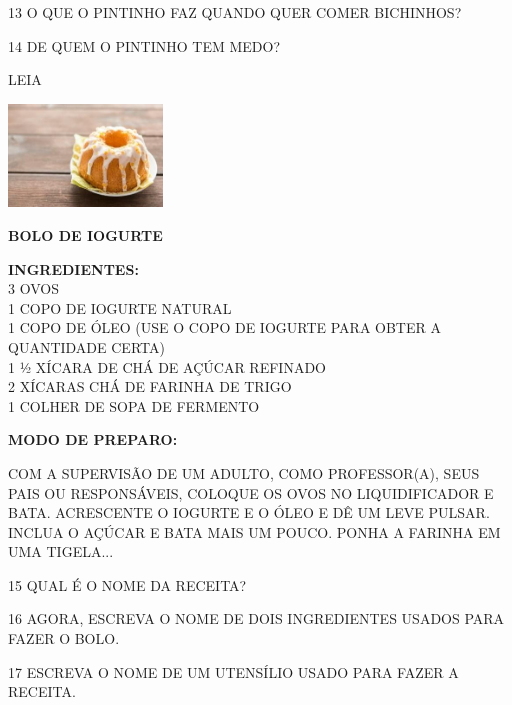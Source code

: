 \num{13} O QUE O PINTINHO FAZ QUANDO QUER COMER BICHINHOS?


\num{14} DE QUEM O PINTINHO TEM MEDO?


LEIA

\includegraphics[width=1.61944in,height=1.07917in]{media/image130.jpg}

\textbf{BOLO DE IOGURTE}

\textbf{INGREDIENTES:}\\
3 OVOS\\
1 COPO DE IOGURTE NATURAL\\
1 COPO DE ÓLEO (USE O COPO DE IOGURTE PARA OBTER A QUANTIDADE CERTA)\\
1 ½ XÍCARA DE CHÁ DE AÇÚCAR REFINADO\\
2 XÍCARAS CHÁ DE FARINHA DE TRIGO\\
1 COLHER DE SOPA DE FERMENTO

\textbf{MODO DE PREPARO:}

COM A SUPERVISÃO DE UM ADULTO, COMO PROFESSOR(A), SEUS PAIS OU RESPONSÁVEIS, COLOQUE OS OVOS NO LIQUIDIFICADOR E BATA. ACRESCENTE O IOGURTE E O ÓLEO
E DÊ UM LEVE PULSAR. INCLUA O AÇÚCAR E BATA MAIS UM POUCO. PONHA A
FARINHA EM UMA TIGELA...



\num{15} QUAL É O NOME DA RECEITA?


\num{16} AGORA, ESCREVA O NOME DE DOIS INGREDIENTES USADOS PARA FAZER O BOLO.


\num{17} ESCREVA O NOME DE UM UTENSÍLIO USADO PARA FAZER A RECEITA.

